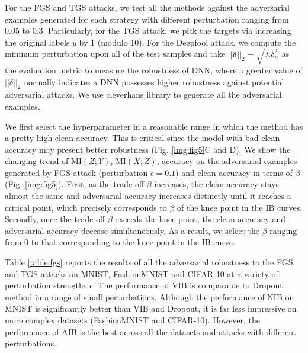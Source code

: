 \documentclass[10pt,journal,compsoc]{IEEEtran}
\begin{document}
For the FGS and TGS attacks, we test all the methods against the adversarial examples generated for each strategy with different perturbation ranging from 0.05 to 0.3. Particularly, for the TGS attack, we pick the targets via increasing the original labels $y$ by 1 (modulo 10).
For the Deepfool attack, we compute the minimum perturbation upon all of the test samples and take $||\boldsymbol{\delta}||_2 = \sqrt{\Sigma \delta_n^2}$ as the evaluation metric to measure the robustness of DNN, where a greater value of $||\delta||_{2}$ normally indicates a DNN possesses higher robustness against potential adversarial attacks.
We use cleverhans library \cite{papernot2018cleverhans} to generate all the adversarial examples.

We first select the hyperparameter in a reasonable range in which the method has a pretty high clean accuracy. This is critical since the model with bad clean accuracy may present better robustness (Fig. \ref{img:fig5}C and D). 
We show the changing trend of $\mathrm{MI}(Z; Y)$,  $\mathrm{MI}(X; Z)$, accuracy on the adversarial examples generated by FGS attack (perturbation $\epsilon = 0.1$) and clean accuracy in terms of $\beta$ (Fig. \ref{img:fig5}). First, as the trade-off $\beta$ increases, the clean accuracy stays almost the same and adversarial accuracy increases distinctly until it reaches a critical point, which precisely corresponds to $\beta$ of the knee point in the IB curves. 
Secondly, once the trade-off $\beta$ exceeds the knee point, the clean accuracy and adversarial accuracy decease simultaneously. As a result, we select the $\beta$ ranging from 0 to that corresponding to the knee point in the IB curve.

Table \ref{table:fgs} reports the results of all the adversarial robustness to the FGS and TGS attacks on MNIST, FashionMNIST and CIFAR-10 at a variety of perturbation strengths $\epsilon$. %
The performance of VIB is comparable to Dropout method in a range of small perturbations. Although the performance of NIB on MNIST is significantly better than VIB and Dropout, it is far less impressive on more complex datasets (FashionMNIST and CIFAR-10). However, the performance of AIB is the best across all the datasets and attacks with different perturbations.
\end{document}
